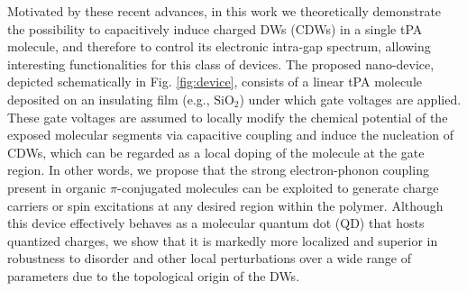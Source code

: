 \documentclass[10pt,a4paper]{article}
\begin{document}
Motivated by these recent advances, in this work we theoretically demonstrate the possibility to capacitively induce charged DWs (CDWs) in a single tPA molecule, and therefore to control its electronic intra-gap spectrum, allowing interesting functionalities for this class of devices. The proposed nano-device, depicted schematically in Fig. \ref{fig:device}, consists of a linear tPA molecule deposited on an insulating film (e.g., $\text{SiO}_2$) under which gate voltages are applied. These gate voltages are assumed to locally modify the chemical potential of the exposed molecular segments via capacitive coupling and induce the nucleation of CDWs, which can be regarded as a local doping of the molecule at the gate region. In other words, we propose that the strong electron-phonon coupling present in organic $\pi$-conjugated molecules can be exploited to generate charge carriers or spin excitations at any desired region within the polymer. Although this device effectively behaves as a molecular quantum dot (QD) that hosts quantized charges, we show that it is markedly more localized and superior in robustness to disorder and other local perturbations over a wide range of parameters due to the topological origin of the DWs.
\end{document}
